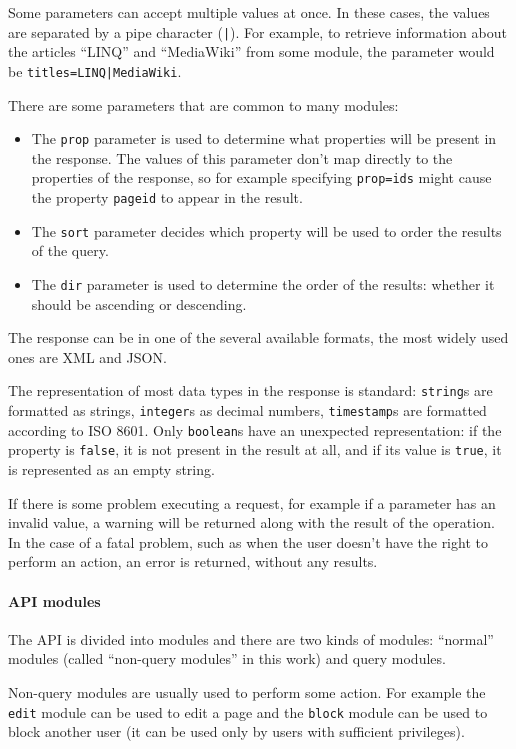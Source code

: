 Some parameters can accept multiple values at once.
In these cases, the values are separated by a pipe character (\texttt{|}).
For example, to retrieve information about the articles “LINQ” and “MediaWiki” from some module,
the parameter would be \texttt{titles=LINQ|MediaWiki}.

There are some parameters that are common to many modules:

\begin{itemize}
\item The \texttt{prop} parameter is used to determine what properties will be present in the response.
The values of this parameter don't map directly to the properties of the response,
so for example specifying \texttt{prop=ids} might cause the property \texttt{pageid} to appear in the result.
\item The \texttt{sort} parameter decides which property will be used to order the results of the query.
\item The \texttt{dir} parameter is used to determine the order of the results:
whether it should be ascending or descending.
\end{itemize}

The response can be in one of the several available formats, the most widely used ones are \ac{XML} and \ac{JSON}.

The representation of most data types in the response is standard:
\texttt{string}s are formatted as strings, \texttt{integer}s as decimal numbers,
\texttt{timestamp}s are formatted according to ISO 8601.
Only \texttt{boolean}s have an unexpected representation:
if the property is \texttt{false}, it is not present in the result at all,
and if its value is \texttt{true}, it is represented as an empty string.

If there is some problem executing a request, for example if a parameter has an invalid value,
a warning will be returned along with the result of the operation.
In the case of a fatal problem, such as when the user doesn't have the right to perform an action,
an error is returned, without any results.

\paragraph{API modules}

The \ac{API} is divided into modules and there are two kinds of modules:
“normal” modules (called “non-query modules” in this work) and query modules.

Non-query modules are usually used to perform some action.
For example the \texttt{edit} module can be used to edit a page
and the \texttt{block} module can be used to block another user (it can be used only by users with sufficient privileges).

